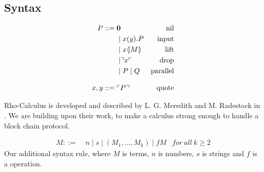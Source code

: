 \subsection{Syntax}
\begin{align*}
    P  ::= \; &  \mathbf{0} & \text{nil} \\
      & \mid x(y).P & \text{input} \\
      & \mid x \langle \! | M | \! \rangle & \text{lift} \\
      & \mid \urcorner x \ulcorner & \text{drop} \\
      & \mid P \mid Q & \text{parallel} \\[3mm]
    x,y ::= \; & \ulcorner P \urcorner & \text{quote}\\
\end{align*}

Rho-Calculus is developed and described by L. G. Meredith and M. Radestock in \citep{Meredith2005}. We are building upon their work, to make a calculus strong enough to handle a block chain protocol.

\begin{align*}
M::=\; & n \mid s \mid (M_1,...,M_k) \mid fM &for\ all\ k \geq 2
\end{align*}
Our additional syntax rule, where $M$ is terms, $n$ is numbers, $s$ is strings and $f$ is a operation.

